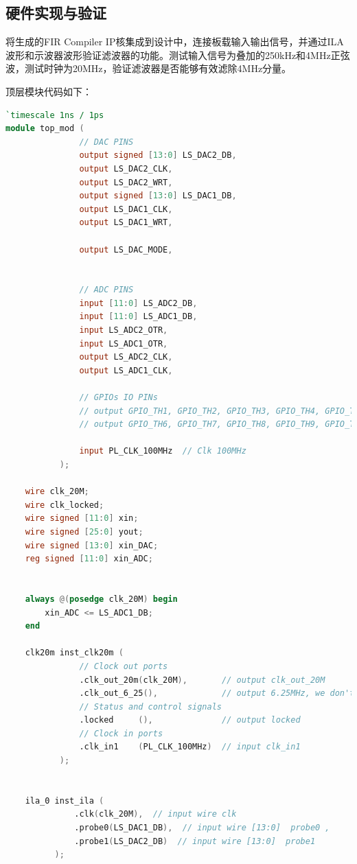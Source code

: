 \subsection{硬件实现与验证}
将生成的FIR Compiler IP核集成到设计中，连接板载输入输出信号，并通过ILA波形和示波器波形验证滤波器的功能。测试输入信号为叠加的250kHz和4MHz正弦波，测试时钟为20MHz，验证滤波器是否能够有效滤除4MHz分量。

顶层模块代码如下：
\begin{lstlisting}[language=verilog,caption={顶层模块代码},label=lst:top_module]
`timescale 1ns / 1ps
module top_mod (
               // DAC PINS
               output signed [13:0] LS_DAC2_DB,
               output LS_DAC2_CLK,
               output LS_DAC2_WRT,
               output signed [13:0] LS_DAC1_DB,
               output LS_DAC1_CLK,
               output LS_DAC1_WRT,
    
               output LS_DAC_MODE,
    
    
               // ADC PINS
               input [11:0] LS_ADC2_DB,
               input [11:0] LS_ADC1_DB,
               input LS_ADC2_OTR,
               input LS_ADC1_OTR,
               output LS_ADC2_CLK,
               output LS_ADC1_CLK,
    
               // GPIOs IO PINs
               // output GPIO_TH1, GPIO_TH2, GPIO_TH3, GPIO_TH4, GPIO_TH5,
               // output GPIO_TH6, GPIO_TH7, GPIO_TH8, GPIO_TH9, GPIO_TH10
    
               input PL_CLK_100MHz  // Clk 100MHz
           );
    
    wire clk_20M;
    wire clk_locked;
    wire signed [11:0] xin;
    wire signed [25:0] yout;
    wire signed [13:0] xin_DAC;
    reg signed [11:0] xin_ADC;
    
    
    always @(posedge clk_20M) begin
        xin_ADC <= LS_ADC1_DB;
    end
    
    clk20m inst_clk20m (
               // Clock out ports
               .clk_out_20m(clk_20M),       // output clk_out_20M
               .clk_out_6_25(),             // output 6.25MHz, we don't use it
               // Status and control signals
               .locked     (),              // output locked
               // Clock in ports
               .clk_in1    (PL_CLK_100MHz)  // input clk_in1
           );
    
    
    ila_0 inst_ila (
              .clk(clk_20M),  // input wire clk
              .probe0(LS_DAC1_DB),  // input wire [13:0]  probe0 ,
              .probe1(LS_DAC2_DB)  // input wire [13:0]  probe1
          );
    

\end{lstlisting}
